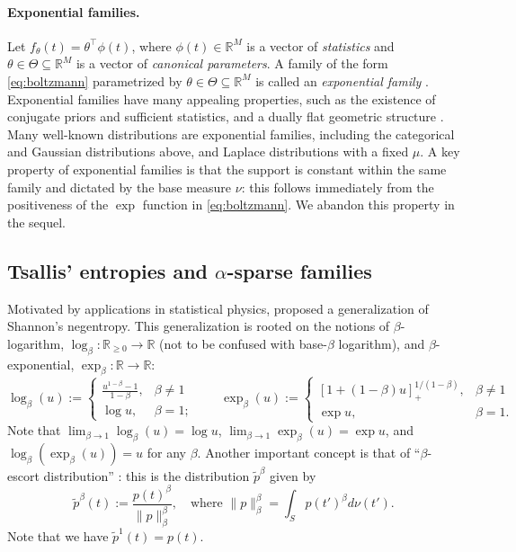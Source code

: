 \documentclass{article}
\begin{document}
\paragraph{Exponential families.} 
Let $f_{\theta}(t) = \theta^\top \phi(t)$, where $\phi(t) \in \mathbb{R}^M$ is a vector of \textit{statistics} and $\theta \in \Theta \subseteq \mathbb{R}^M$ is a vector of \textit{canonical parameters}. 
A family of the form \eqref{eq:boltzmann} parametrized by $\theta \in \Theta \subseteq \mathbb{R}^M$ is called an {\it exponential family} \citep{barndorff2014information}. 
Exponential families 
have many appealing properties, such as the existence of conjugate priors and sufficient statistics, and a dually flat geometric structure \citep{amari2016information}. Many well-known distributions are exponential families, including the categorical and Gaussian distributions above, and Laplace distributions with a fixed $\mu$. 
A key property of exponential families is that the support is constant within the same family and dictated by the base measure $\nu$: this follows immediately from the positiveness of the $\exp$ function in \eqref{eq:boltzmann}. We abandon this property in the sequel.



\subsection{Tsallis' entropies and $\alpha$-sparse families}

Motivated by applications in statistical physics,
\citet{Tsallis1988} proposed a generalization of Shannon's negentropy. 
This generalization is rooted on the notions of  $\beta$-logarithm, $\log_{\beta}: \mathbb{R}_{\ge 0} \rightarrow \mathbb{R}$ (not to be confused with base-$\beta$ logarithm), and $\beta$-exponential, $\exp_{\beta}: \mathbb{R} \rightarrow \mathbb{R}$: 
\begin{equation}\label{eq:beta_log_exp}
    \log_{\beta}(u) := \left\{
    \begin{array}{ll}
        \frac{u^{1-\beta} - 1}{1-\beta}, & \beta \ne 1 \\
        \log u, & \beta = 1;
    \end{array}
    \right.
    \qquad
    \exp_{\beta}(u) := \left\{
    \begin{array}{ll}
     	[1 + (1-\beta)u]_+^{1/(1-\beta)}, & \beta \ne 1 \\
        \exp u, & \beta = 1.
    \end{array}
    \right.    
\end{equation}
Note that ${\lim_{\beta \rightarrow 1}}\log_\beta(u) = \log u$, ${\lim_{\beta \rightarrow 1}}\exp_\beta(u) = \exp u$, and $\log_\beta(\exp_\beta(u)) = u$ for any $\beta$. 
Another important concept is that of ``$\beta$-escort distribution''  \citep{Tsallis1988}: this is the distribution $\tilde{p}^{\beta}$ given by
\begin{equation}\label{eq:escort}
\tilde{p}^{\beta}(t) := \frac{p(t)^{\beta}}{\|p\|_\beta^\beta}, \quad \text{where $\|p\|_\beta^\beta = \int_{S} p(t')^{\beta} d\nu(t')$}.
\end{equation}
Note that we have $\tilde{p}^{1}(t) = p(t)$. 
\end{document}
